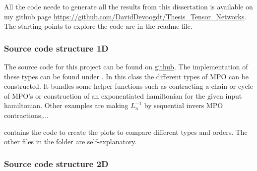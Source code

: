
All the code neede to generate all the results from this dissertation is available on my github page \url{https://github.com/DavidDevoogdt/Thesis_Tensor_Networks}. The starting points to explore the code are in the readme file.

\subsubsection{Source code structure 1D}

The source code for this project can be found on \href{https://github.com/DavidDevoogdt/Thesis_Tensor_Networks}{github}. The implementation of these types can be found under . In this class the different types of MPO can be constructed. It bundles some helper functions such as contracting a chain or cycle of MPO's or construction of an exponentiated hamiltonian for the given input hamiltonian. Other examples are making $L_n^{-1}$ by sequential invers MPO contractions,...

  contains the code to create the plots to compare different types and orders. The other files in the folder are self-explanatory.

\subsubsection{Source code structure 2D}

